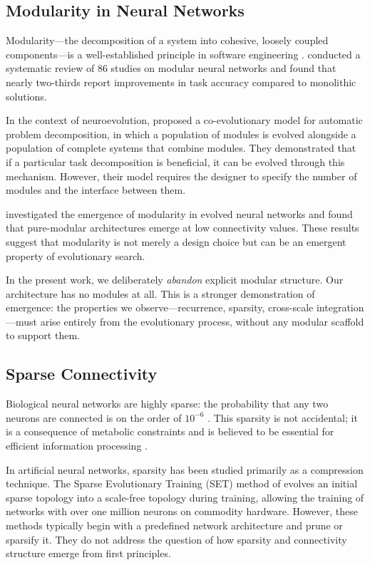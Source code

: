 \subsection{Modularity in Neural Networks}

Modularity---the decomposition of a system into cohesive, loosely coupled
components---is a well-established principle in software engineering
\citep{parnas1972modularity}. \citet{alho2024modularity} conducted a
systematic review of $86$ studies on modular neural networks and found that
nearly two-thirds report improvements in task accuracy compared to
monolithic solutions.

In the context of neuroevolution, \citet{khare2005coevolutionary} proposed
a co-evolutionary model for automatic problem decomposition, in which a
population of modules is evolved alongside a population of complete
systems that combine modules. They demonstrated that if a particular task
decomposition is beneficial, it can be evolved through this mechanism.
However, their model requires the designer to specify the number of modules
and the interface between them.

\citet{landassuri2012evolution} investigated the emergence of modularity
in evolved neural networks and found that pure-modular architectures emerge
at low connectivity values. These results suggest that modularity is not
merely a design choice but can be an emergent property of evolutionary
search.

In the present work, we deliberately \emph{abandon} explicit modular
structure. Our architecture has no modules at all. This is a stronger
demonstration of emergence: the properties we observe---recurrence,
sparsity, cross-scale integration---must arise entirely from the
evolutionary process, without any modular scaffold to support them.

\subsection{Sparse Connectivity}

Biological neural networks are highly sparse: the probability that any two
neurons are connected is on the order of $10^{-6}$ \citep{lecun2015deep}.
This sparsity is not accidental; it is a consequence of metabolic
constraints and is believed to be essential for efficient information
processing \citep{chklovskii2004wiring}.

In artificial neural networks, sparsity has been studied primarily as a
compression technique. The Sparse Evolutionary Training (SET) method of
\citet{mocanu2018scalable} evolves an initial sparse topology into a
scale-free topology during training, allowing the training of networks
with over one million neurons on commodity hardware. However, these methods
typically begin with a predefined network architecture and prune or
sparsify it. They do not address the question of how sparsity and
connectivity structure emerge from first principles.


